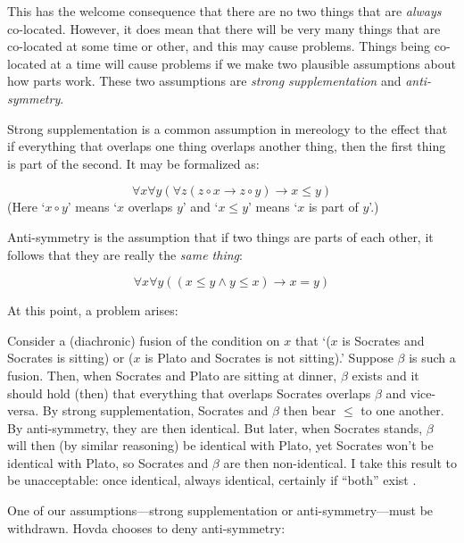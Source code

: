 \documentclass[12pt,twoside]{reedfancy}
\newenvironment{squote}{%
	\begin{spacing}{1}
	\begin{list}{}{%
	\setlength{\labelwidth}{0pt}%
	\rightmargin\leftmargin%
	}
	\item\relax
	}{%
	\end{list}%
	\end{spacing}
	}
\begin{document}
\begin{spacing}{1.25}
This has the welcome consequence that there are no two things that are
{\em always} co-located.  However, it does mean that there will be
very many things that are co-located at some time or other, and this
may cause problems.  Things being co-located at a time will cause
problems if we make two plausible assumptions about how parts work.
These two assumptions are {\em strong supplementation} and {\em
  anti-symmetry}.

Strong supplementation is a common assumption in mereology to the
effect that if everything that overlaps one thing overlaps another
thing, then the first thing is part of the second.  It may be
formalized as:

\begin{displaymath}
\forall x \forall y ( \forall z ( z \circ x \rightarrow z \circ y )
\rightarrow x \leq y )
\end{displaymath}
(Here `$x \circ y$' means `$x$ overlaps $y$' and `$x \leq y$' means
`$x$ is part of $y$'.)

Anti-symmetry is the assumption that if two things are parts of each
other, it follows that they are really the {\em same thing}:

\begin{displaymath}
\forall x \forall y ( ( x \leq y \wedge y \leq x ) \rightarrow x = y )
\end{displaymath}

At this point, a problem arises:

\begin{squote}
Consider a (diachronic) fusion of the condition on $x$ that `($x$ is
Socrates and Socrates is sitting) or ($x$ is Plato and Socrates is not
sitting).'  Suppose $\beta$ is such a fusion.  Then, when Socrates and
Plato are sitting at dinner, $\beta$ exists and it should hold (then)
that everything that overlaps Socrates overlaps $\beta$ and
vice-versa.  By strong supplementation, Socrates and $\beta$ then bear
$\leq$ to one another.  By anti-symmetry, they are then identical.
But later, when Socrates stands, $\beta$ will then (by similar
reasoning) be identical with Plato, yet Socrates won't be identical
with Plato, so Socrates and $\beta$ are then non-identical.  I take
this result to be unacceptable: once identical, always identical,
certainly if ``both'' exist \citeyearpar[sec. 3.1.2]{hovda2011}.
\end{squote}

One of our assumptions---strong supplementation or
anti-symmetry---must be withdrawn.  Hovda chooses to deny
anti-symmetry:


\end{spacing}
\end{document}

